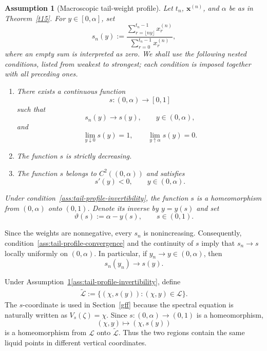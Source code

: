 \documentclass[11pt]{amsart}
\theoremstyle{plain}
\newtheorem{assumption}[theorem]{Assumption}
\numberwithin{equation}{section}
\numberwithin{theorem}{section}
\numberwithin{figure}{section}
\begin{document}
\begin{assumption}[Macroscopic tail-weight profile]
\label{ass:tail-profile}
Let $t_n$, $\mathbf x^{(n)}$, and $\alpha$ be as in
Theorem~\ref{t15}. For $y\in[0,\alpha]$, set
\begin{equation}
    s_n(y)
    :=
    \frac{
        \displaystyle\sum_{r=\lfloor ny\rfloor}^{t_n-1}x_r^{(n)}
    }{
        \displaystyle\sum_{r=0}^{t_n-1}x_r^{(n)}
    },
    \label{eq:discrete-tail-profile}
\end{equation}
where an empty sum is interpreted as zero. We shall use the following
nested conditions, listed from weakest to strongest; each condition is
imposed together with all preceding ones.
\begin{enumerate}[label=\textup{(\arabic*)},ref=\textup{(\arabic*)}]
\item\label{ass:tail-profile-convergence}
There exists a continuous function
\[
    s:(0,\alpha)\longrightarrow[0,1]
\]
such that
\[
    s_n(y)\longrightarrow s(y),
    \qquad y\in(0,\alpha),
\]
and
\[
    \lim_{y\downarrow0}s(y)=1,
    \qquad
    \lim_{y\uparrow\alpha}s(y)=0.
\]
\item\label{ass:tail-profile-invertibility}
The function $s$ is strictly decreasing.
\item\label{ass:tail-profile-regularity}
The function $s$ belongs to $C^2((0,\alpha))$ and satisfies
\[
    s'(y)<0,
    \qquad y\in(0,\alpha).
\]
\end{enumerate}
Under condition~\ref{ass:tail-profile-invertibility}, the function $s$ is a
homeomorphism from $(0,\alpha)$ onto $(0,1)$. Denote its inverse by
$y=y(s)$ and set
\begin{equation}
    \vartheta(s):=\alpha-y(s),
    \qquad s\in(0,1).
    \label{eq:theta-tail-profile}
\end{equation}
\end{assumption}

Since the weights are nonnegative, every $s_n$ is nonincreasing.
Consequently, condition~\ref{ass:tail-profile-convergence} and the
continuity of $s$ imply that $s_n\to s$ locally uniformly on
$(0,\alpha)$. In particular, if $y_n\to y\in(0,\alpha)$, then
\[
    s_n(y_n)\longrightarrow s(y).
\]

Under Assumption~\ref{ass:tail-profile}\ref{ass:tail-profile-invertibility}, define
\begin{align}
    \widetilde{\mathcal L}
    :=
    \{(\chi,s(y)):(\chi,y)\in\mathcal L\}.\label{dll}
\end{align}
The $s$-coordinate is used in Section~\ref{gff} because the spectral
equation is naturally written as $V_s(\zeta)=\chi$. Since
$s:(0,\alpha)\to(0,1)$ is a homeomorphism,
\[
    (\chi,y)\longmapsto(\chi,s(y))
\]
is a homeomorphism from $\mathcal L$ onto
$\widetilde{\mathcal L}$. Thus the two regions contain the same liquid
points in different vertical coordinates.
\end{document}
